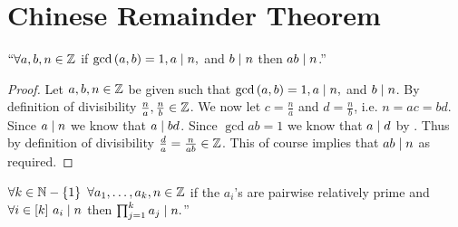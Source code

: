     \section{Chinese Remainder Theorem}
        \begin{lemma}
            $``\forall a, b, n \in \mathbb{Z}$ if $\mathrm{gcd}\left(a, b\right) = 1, a \mid n,$ and $b \mid n$
            then $ab \mid n$.''
            \label{CRT uniquness lemma}
        \end{lemma}
        \begin{proof}
            Let $a, b, n \in \mathbb{Z}$ be given such that $\mathrm{gcd}\left(a, b\right) = 1, a \mid n,$ and
            $b \mid n$. By definition of divisibility $\frac{n}{a}, \frac{n}{b} \in \mathbb{Z}$.
            We now let $c = \frac{n}{a}$ and $d = \frac{n}{b}$, i.e. $n = ac = bd$. Since $a \mid n$
            we know that $a \mid bd$. Since $\gcd{a}{b} = 1$ we know that $a \mid d$ by 
            . Thus by definition of divisibility $\frac{d}{a} = \frac{n}{ab} \in \mathbb{Z}$.
            This of course implies that $ab \mid n$ as required. \QED
        \end{proof}
        \begin{corollary}
            $\forall k \in \setsub{\set{N}}{\Set{1}} \ \forall a_1, \dots, a_k, n \in \set{Z}$ if
            the $a_i$'s are pairwise relatively prime and $\forall i \in [k] \ a_i \mid n$ then
            $\prod_{j = 1}^k a_j \mid n.$''
            \label{CRT uniquness corollary}
        \end{corollary}
